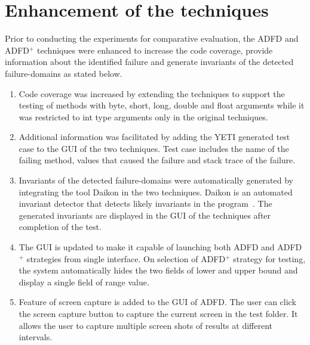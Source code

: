 \section{Enhancement of the techniques}
Prior to conducting the experiments for comparative evaluation, the ADFD and ADFD$^+$ techniques were enhanced to increase the code coverage, provide information about the identified failure and generate invariants of the detected failure-domains as stated below. 
\begin{enumerate}

\item Code coverage was increased by extending the techniques to support the testing of methods with byte, short, long, double and float arguments while it was restricted to int type arguments only in the original techniques.

\item Additional information was facilitated by adding the YETI generated test case to the GUI of the two techniques. Test case includes the name of the failing method, values that caused the failure and stack trace of the failure.

\item Invariants of the detected failure-domains were automatically generated by integrating the tool Daikon in the two techniques. Daikon is an automated invariant detector that detects likely invariants in the program~\cite{ernst2007daikon}. The generated invariants are displayed in the GUI of the techniques after completion of the test. 

\item The GUI is updated to make it capable of launching both ADFD and ADFD$^+$ strategies from single interface. On selection of ADFD$^+$ strategy for testing, the system automatically hides the two fields of lower and upper bound and display a single field of range value. 

\item Feature of screen capture is added to the GUI of ADFD. The user can click the screen capture button to capture the current screen in the test folder. It allows the user to capture multiple screen shots of results at different intervals. 

\end{enumerate}

